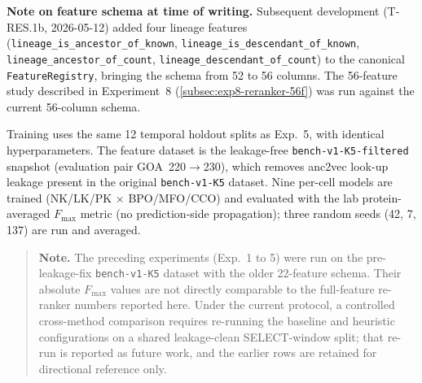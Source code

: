 \textbf{Note on feature schema at time of writing.} Subsequent development
(T-RES.1b, 2026-05-12) added four lineage features
(\texttt{lineage\_is\_ancestor\_of\_known}, \texttt{lineage\_is\_descendant\_of\_known},
\texttt{lineage\_ancestor\_of\_count}, \texttt{lineage\_descendant\_of\_count}) to
the canonical \texttt{FeatureRegistry}, bringing the schema from 52 to 56 columns.
The 56-feature study described in Experiment~8 (\cref{subsec:exp8-reranker-56f}) was run
against the current 56-column schema.

Training uses the same 12 temporal holdout splits as Exp.~5, with identical
hyperparameters. The feature dataset is the leakage-free
\texttt{bench-v1-K5-filtered} snapshot (evaluation pair GOA~220$\to$230),
which removes anc2vec look-up leakage present in the original
\texttt{bench-v1-K5} dataset. Nine per-cell models are trained
(NK/LK/PK $\times$ BPO/MFO/CCO) and evaluated with the lab
protein-averaged $F_{\max}$ metric (no prediction-side propagation); three
random seeds (42, 7, 137) are run and averaged.

\begin{quote}
\textbf{Note.} The preceding experiments (Exp.~1 to 5) were run on the
pre-leakage-fix \texttt{bench-v1-K5} dataset with the older 22-feature schema.
Their absolute $F_{\max}$ values are not directly comparable to the full-feature
re-ranker numbers reported here. Under the current protocol, a controlled
cross-method comparison requires re-running the baseline and heuristic
configurations on a shared leakage-clean SELECT-window split; that re-run is
reported as future work, and the earlier rows are retained for directional
reference only.
\end{quote}

